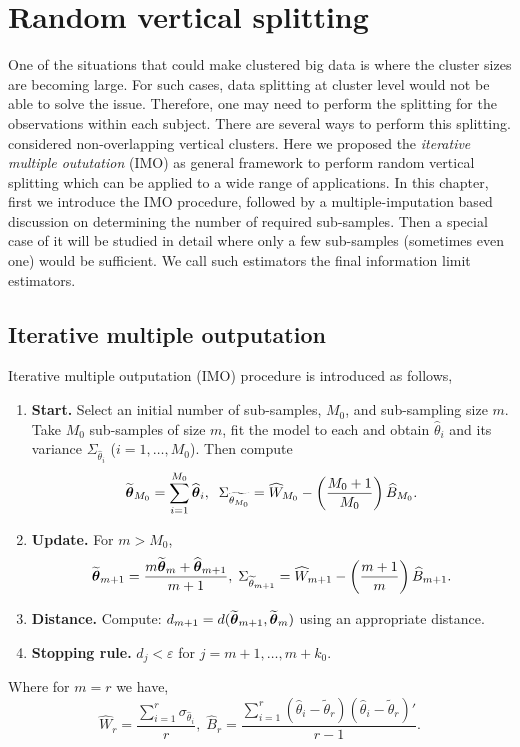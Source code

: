 \documentclass[11pt,a5paper,twoside]{book}
\newcommand{\bftheta}{\mbox{\boldmath $\theta$}}
\begin{document}
\chapter{Random vertical splitting}
\label{chap_random_vertical}
One of the situations that could make clustered big data is where the cluster sizes are becoming large. For such cases, data splitting at cluster level would not be able to solve the issue. Therefore, one may need to perform the splitting for the observations within each subject. There are several ways to perform this splitting. \cite{Iddi2011} considered non-overlapping vertical clusters. Here we proposed the \emph{iterative multiple oututation} (IMO) as general framework to perform random vertical splitting which can be applied to a wide range of applications. In this chapter, first we introduce the IMO procedure, followed by a multiple-imputation based discussion on determining the number of required sub-samples. Then a special case of it will be studied in detail where only a few sub-samples (sometimes even one) would be sufficient. We call such estimators the final information limit estimators.


\section{Iterative multiple outputation}

Iterative multiple outputation (IMO) procedure is introduced as follows,

\begin{enumerate}
\item \textbf{Start.} Select an initial number of sub-samples, $M_0$, and sub-sampling size $m$. Take $M_0$ sub-samples of size $m$, fit the model to each and obtain $\widehat{\theta}_i$ and its variance $\Sigma_{\widehat{\theta}_i}$ ($i=1,\ldots,M_0$). Then compute 
\begin{equation}
\label{comb_rules}
\widetilde{\bftheta}_{M_0} = \sum_{i=1}^{M_0} \widehat{\bftheta}_i,\;\; \Sigma_{\widetilde{\theta_{M_0}}}=\widehat{W}_{M_0} - \left( \frac{M_0+1}{M_0} \right) \widehat{B}_{M_0}.
\end{equation}

			\item \textbf{Update.} For $m>M_0$, \begin{equation}
	\label{imointroupdate}
	\widetilde{{\bftheta}}_{m+1}=\frac{m\widetilde{\bftheta}_m + \widehat{\bftheta}_{m+1}}{m+1},\; \Sigma_{\widetilde{\theta}_{m+1}}=\widehat{W}_{m+1} - \left( \frac{m+1}{m} \right) \widehat{B}_{m+1}.
	\end{equation}
	\item \textbf{Distance.} Compute: $d_{m+1}=d(\widetilde{\bftheta}_{m+1},\widetilde{\bftheta}_{m})$ using an appropriate distance.
	\item \textbf{Stopping rule.} $d_{j} < \varepsilon$ for $j=m+1,\ldots,m+k_0$.
\end{enumerate}
Where for $m=r$ we have,
\begin{equation}
\widehat{W}_r= \frac{\sum_{i=1}^r \sigma_{\widehat{\theta}_i}}{r},\; \widehat{B}_r= \frac{\sum_{i=1}^r (\widehat{\theta}_i - \widetilde{\theta}_r)(\widehat{\theta}_i - \widetilde{\theta}_r)'}{r-1}.
\end{equation}
\end{document}
